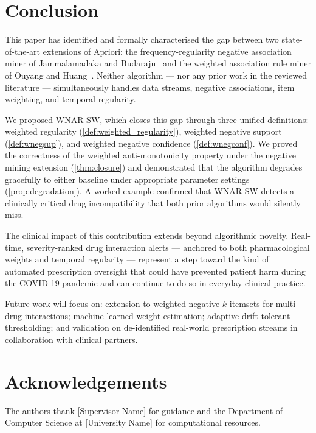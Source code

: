 \documentclass[10pt,twocolumn]{article}
\theoremstyle{plain}
\theoremstyle{definition}
\theoremstyle{remark}
\begin{document}
\section{Conclusion}
\label{sec:conclusion}

This paper has identified and formally characterised the gap between
two state-of-the-art extensions of Apriori: the frequency-regularity
negative association miner of Jammalamadaka and Budaraju~\cite{sastry2025}
and the weighted association rule miner of Ouyang and Huang~\cite{ouyang2015}.
Neither algorithm — nor any prior work in the reviewed literature —
simultaneously handles data streams, negative associations, item
weighting, and temporal regularity.

We proposed WNAR-SW, which closes this gap through three unified
definitions: weighted regularity (\cref{def:weighted_regularity}),
weighted negative support (\cref{def:wnegsup}), and weighted negative
confidence (\cref{def:wnegconf}).
We proved the correctness of the weighted anti-monotonicity property
under the negative mining extension (\cref{thm:closure}) and
demonstrated that the algorithm degrades gracefully to either baseline
under appropriate parameter settings (\cref{prop:degradation}).
A worked example confirmed that WNAR-SW detects a clinically critical
drug incompatibility that both prior algorithms would silently miss.

The clinical impact of this contribution extends beyond algorithmic
novelty.
Real-time, severity-ranked drug interaction alerts — anchored to both
pharmacological weights and temporal regularity — represent a step
toward the kind of automated prescription oversight that could have
prevented patient harm during the COVID-19 pandemic and can continue
to do so in everyday clinical practice.

Future work will focus on:
extension to weighted negative $k$-itemsets for multi-drug
interactions;
machine-learned weight estimation;
adaptive drift-tolerant thresholding;
and validation on de-identified real-world prescription streams in
collaboration with clinical partners.

\section*{Acknowledgements}
The authors thank [Supervisor Name] for guidance and the Department of
Computer Science at [University Name] for computational resources.
\end{document}

